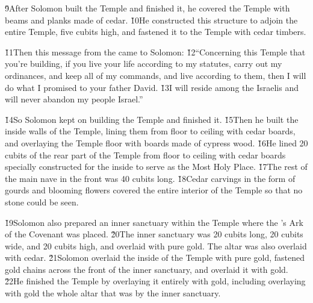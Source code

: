 \v{9}After Solomon built the Temple and finished it, he covered the Temple with beams and planks made of cedar. \v{10}He constructed this structure to adjoin the entire Temple, five cubits high, and fastened it to the Temple with cedar timbers.

\v{11}Then this message from the  came to Solomon: \v{12}``Concerning this Temple that you're building, if you live your life according to my statutes, carry out my ordinances, and keep all of my commands, and live according to them, then I will do what I promised to your father David. \v{13}I will reside among the Israelis and will never abandon my people Israel.''

\v{14}So Solomon kept on building the Temple and finished it. \v{15}Then he built the inside walls of the Temple, lining them from floor to ceiling with cedar boards, and overlaying the Temple floor with boards made of cypress wood. \v{16}He lined 20 cubits of the rear part of the Temple from floor to ceiling with cedar boards specially constructed for the inside to serve as the Most Holy Place. \v{17}The rest of the main nave in the front was 40 cubits long. \v{18}Cedar carvings in the form of gourds and blooming flowers covered the entire interior of the Temple so that no stone could be seen.

\v{19}Solomon also prepared an inner sanctuary within the Temple where the 's Ark of the Covenant was placed. \v{20}The inner sanctuary was 20 cubits long, 20 cubits wide, and 20 cubits high, and overlaid with pure gold. The altar was also overlaid with cedar. \v{21}Solomon overlaid the inside of the Temple with pure gold, fastened gold chains across the front of the inner sanctuary, and overlaid it with gold. \v{22}He finished the Temple by overlaying it entirely with gold, including overlaying with gold the whole altar that was by the inner sanctuary.

